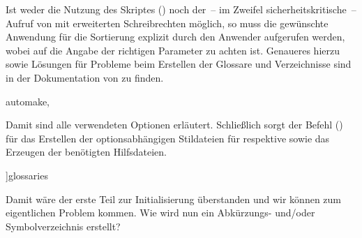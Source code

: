 \documentclass[%
  english,ngerman,%
  cdgeometry=no,DIV=12,automark%
]{tudscrartcl}
\begin{document}
Ist weder die Nutzung des Skriptes () 
noch der~-- im Zweifel sicherheitskritische~-- Aufruf von  mit 
erweiterten Schreibrechten möglich, so muss die gewünschte Anwendung für die 
Sortierung explizit durch den Anwender aufgerufen werden, wobei auf die Angabe 
der richtigen Parameter zu achten ist. Genaueres hierzu sowie Lösungen für 
Probleme beim Erstellen der Glossare und Verzeichnisse sind in der Dokumentation
von  zu finden.
%
\begin{Hint}
  automake,%
\end{Hint}
%
Damit sind alle verwendeten Optionen erläutert. Schließlich sorgt der Befehl 
() für das Erstellen der 
optionsabhängigen Stildateien für  respektive 
 sowie das Erzeugen der benötigten Hilfsdateien.
%
\begin{Preamble}
]{glossaries}
\makeglossaries
\end{Preamble}
\begin{Preamble+}
}%

\AfterPackage*{glossaries}{%
\end{Preamble+}
%
Damit wäre der erste Teil zur Initialisierung überstanden und wir können zum 
eigentlichen Problem kommen. Wie wird nun ein Abkürzungs- und/oder 
Symbolverzeichnis erstellt?
\end{document}
